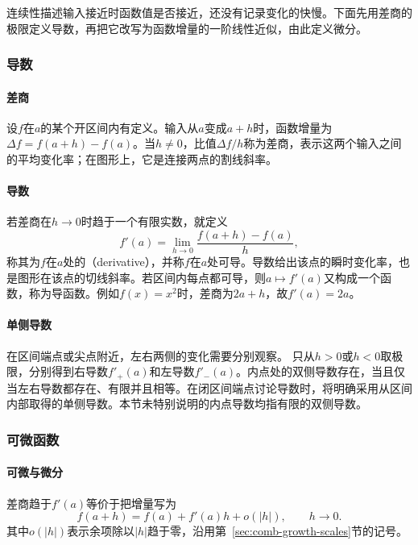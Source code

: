 连续性描述输入接近时函数值是否接近，还没有记录变化的快慢。下面先用差商的极限定义导数，再把它改写为函数增量的一阶线性近似，由此定义微分。

\subsubsection{导数}

\paragraph{差商}
设$f$在$a$的某个开区间内有定义。输入从$a$变成$a+h$时，函数增量为$\Delta f=f(a+h)-f(a)$。当$h\neq0$，比值$\Delta f/h$称为差商，表示这两个输入之间的平均变化率；在图形上，它是连接两点的割线斜率。

\paragraph{导数}
若差商在$h\to0$时趋于一个有限实数，就定义
\[
 f'(a)=\lim_{h\to0}\frac{f(a+h)-f(a)}h,
\]
称其为$f$在$a$处的（derivative），并称$f$在$a$处可导。导数给出该点的瞬时变化率，也是图形在该点的切线斜率。若区间内每点都可导，则$a\mapsto f'(a)$又构成一个函数，称为导函数。例如$f(x)=x^2$时，差商为$2a+h$，故$f'(a)=2a$。

\paragraph{单侧导数}
在区间端点或尖点附近，左右两侧的变化需要分别观察。
只从$h>0$或$h<0$取极限，分别得到右导数$f'_+(a)$和左导数$f'_-(a)$。内点处的双侧导数存在，当且仅当左右导数都存在、有限并且相等。在闭区间端点讨论导数时，将明确采用从区间内部取得的单侧导数。本节未特别说明的内点导数均指有限的双侧导数。

\subsubsection{可微函数}

\paragraph{可微与微分}

差商趋于$f'(a)$等价于把增量写为
\begin{equation}
 f(a+h)=f(a)+f'(a)h+o(|h|),\qquad h\to0.
\label{eq:analysis-scalar-first-order}
\end{equation}
其中$o(|h|)$表示余项除以$|h|$趋于零，沿用第~\ref{sec:comb-growth-scales}节的记号。

